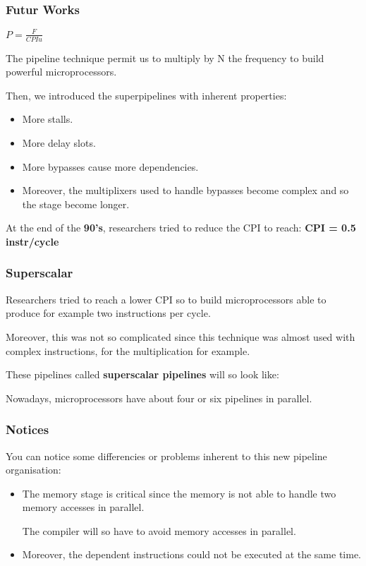 \begin{frame}
  \frametitle{Futur Works}

  \textbf{$P = \frac{F}{CPIu}$}

  \-

  The pipeline technique permit us to multiply by N the frequency to build
  powerful microprocessors.

  \-

  Then, we introduced the superpipelines with inherent properties:

  \begin{itemize}
    \item
      More stalls.
    \item
      More delay slots.
    \item
      More bypasses cause more dependencies.
    \item
      Moreover, the multiplixers used to handle bypasses become complex
      and so the stage become longer.
  \end{itemize}

  At the end of the \textbf{90's}, researchers tried to reduce the CPI to
  reach: \textbf{CPI = 0.5 instr/cycle}
\end{frame}


\begin{frame}
  \frametitle{Superscalar}

  Researchers tried to reach a lower CPI so to build microprocessors able
  to produce for example two instructions per cycle.

  \-

  Moreover, this was not so complicated since this technique was almost
  used with complex instructions, for the multiplication for example.

  \-

  These pipelines called \textbf{superscalar pipelines} will so look like:

  \begin{center}
  \end{center}

  Nowadays, microprocessors have about four or six pipelines in parallel.
\end{frame}


\begin{frame}
  \frametitle{Notices}

  You can notice some differencies or problems inherent to this new pipeline
  organisation:

  \begin{itemize}
    \item
      The memory stage is critical since the memory is not able to handle
      two memory accesses in parallel.

      \-

      The compiler will so have to avoid memory accesses in parallel.
    \item
      Moreover, the dependent instructions could not be executed at the
      same time.
  \end{itemize}
\end{frame}

